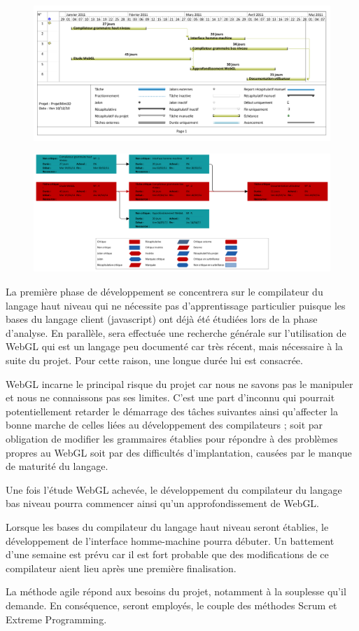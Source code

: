

\begin{figure}[h]
 \includegraphics[width=\textwidth]{strategie/diag_gantt}
\end{figure}

\begin{figure}[h]
 \includegraphics[width=\textwidth]{strategie/org_desc_tach}
\end{figure}

La première phase de développement se concentrera sur le compilateur du langage haut niveau qui ne nécessite pas d’apprentissage particulier 
puisque les bases du langage client (javascript) ont déjà été  étudiées lors de la phase d’analyse. 
En parallèle, sera effectuée une recherche générale sur l’utilisation de WebGL qui est un langage peu documenté car très récent, 
mais nécessaire à la suite du projet. Pour cette raison, une longue durée lui est consacrée.


WebGL incarne le principal risque du projet car nous ne savons pas le manipuler et nous ne connaissons pas ses limites.
 C’est une part d’inconnu qui pourrait potentiellement retarder le démarrage des tâches suivantes ainsi qu’affecter la bonne marche de celles 
liées au développement des compilateurs ; soit par obligation de modifier les grammaires établies pour répondre à des problèmes propres au WebGL 
soit par des difficultés d’implantation, causées par le manque de maturité du langage.

Une fois l’étude WebGL achevée, le développement du compilateur du langage bas niveau pourra commencer ainsi qu’un approfondissement de WebGL.


Lorsque les bases du compilateur du langage haut niveau seront établies, le développement de l’interface homme-machine pourra débuter.
 Un battement d’une semaine est prévu car il est fort probable que des modifications de ce compilateur aient lieu après une première finalisation.

La méthode agile répond aux besoins du projet, notamment à la souplesse qu’il demande. 
En conséquence, seront employés, le couple des méthodes Scrum et Extreme Programming. 